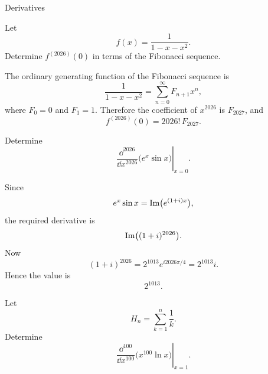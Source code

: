 \begin{expectedproblemgroup}{Derivatives}
        \begin{expectedsubproblem}
            Let
            \[
                f(x)=\frac{1}{1-x-x^2}.
            \]
            Determine $f^{(2026)}(0)$ in terms of the Fibonacci sequence.
        \end{expectedsubproblem}

        \begin{expectedsubsolution}
            The ordinary generating function of the Fibonacci sequence is
            \[
                \frac{1}{1-x-x^2}
                =
                \sum_{n=0}^{\infty}F_{n+1}x^n,
            \]
            where $F_0=0$ and $F_1=1$. Therefore the coefficient of $x^{2026}$ is
            $F_{2027}$, and
            \[
                \boxed{f^{(2026)}(0)=2026!\,F_{2027}}.
            \]
        \end{expectedsubsolution}

        \begin{expectedsubproblem}
            Determine
            \[
                \left.
                \frac{\dd^{2026}}{\dd x^{2026}}
                \bigl(e^x\sin x\bigr)
                \right|_{x=0}.
            \]
        \end{expectedsubproblem}

        \begin{expectedsubsolution}
            Since
            \[
                e^x\sin x
                =
                \operatorname{Im}\bigl(e^{(1+i)x}\bigr),
            \]
            the required derivative is
            \[
                \operatorname{Im}\bigl((1+i)^{2026}\bigr).
            \]
            Now
            \[
                (1+i)^{2026}
                =
                2^{1013}e^{i2026\pi/4}
                =
                2^{1013}i.
            \]
            Hence the value is
            \[
                \boxed{2^{1013}}.
            \]
        \end{expectedsubsolution}

        \begin{expectedsubproblem}
            Let
            \[
                H_n=\sum_{k=1}^{n}\frac{1}{k}.
            \]
            Determine
            \[
                \left.
                \frac{\dd^{100}}{\dd x^{100}}
                \bigl(x^{100}\ln x\bigr)
                \right|_{x=1}.
            \]
        \end{expectedsubproblem}


\end{expectedproblemgroup}
